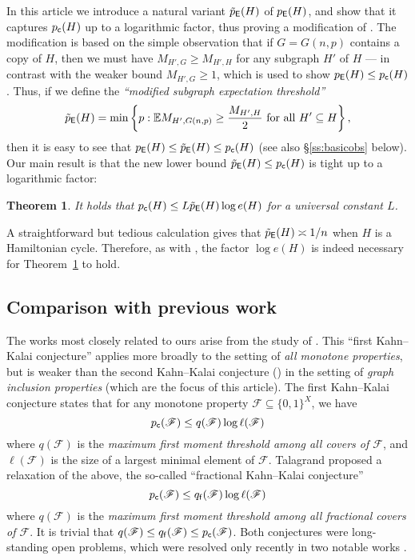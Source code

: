 \documentclass[11pt,reqno]{amsart}
\theoremstyle{plain}
\newtheorem{theorem}{Theorem}
\theoremstyle{definition}
\theoremstyle{remark}
\newcommand{\E}{\mathbb{E}}
\newcommand{\beq}{\begin{equation}}
\newcommand{\eeq}{\end{equation}}
\begin{document}
In this article we introduce a natural variant $\tilde{p}_\mathsf{E}(H)$ of $p_\mathsf{E}(H)$, and show that it captures $p_\mathsf{c}(H)$ up to a logarithmic factor, thus proving a modification of \cite[Conjecture~2]{kahn2007thresholds}. The modification is based on the simple observation that if $G=G(n,p)$ contains a copy of $H$, then we must have $M_{H',G} \ge M_{H',H}$ for any subgraph $H'$ of $H$ --- in contrast with the weaker bound $M_{H',G}\ge1$, which is used to show $p_\mathsf{E}(H) \le p_\mathsf{c}(H)$. Thus, if we define the  \emph{``modified subgraph expectation threshold''} 
	\beq\label{e:pEnew}
	\pEnew(H)
	=\min\bigg\{ p : \E M_{H',G(n,p)} \ge \frac{M_{H',H}}{2}
	\textup{ for all } H' \subseteq H\bigg\}\,,
	\eeq
then it is easy to see that $p_\mathsf{E}(H) \le \tilde{p}_\mathsf{E}(H) \le p_\mathsf{c}(H)$ {(see also \S\ref{ss:basicobs} below).} Our main result is that the
new lower bound $\tilde{p}_\mathsf{E}(H)\le p_\mathsf{c}(H)$ is tight up to a logarithmic factor:

\begin{theorem}\label{thm:main}
It holds that $p_\mathsf{c}(H) \le L \tilde{p}_\mathsf{E}(H)\log e(H)$ for a universal constant $L$.
\end{theorem} 

A straightforward but tedious calculation gives that $\tilde{p}_\mathsf{E}(H)\asymp 1/n$ when $H$ is a Hamiltonian cycle. Therefore, as with
\cite[Conjecture~2]{kahn2007thresholds}, the factor $\log e(H)$ is indeed necessary for Theorem~\ref{thm:main} to hold.

\subsection{Comparison with previous work}

The works most closely related to ours arise from the study of  \cite[Conjecture~1]{kahn2007thresholds}. 
 This ``first Kahn--Kalai conjecture'' applies more broadly to the setting of \emph{all monotone properties}, but is weaker than the second Kahn--Kalai conjecture (\cite[Conjecture~2]{kahn2007thresholds}) in the setting of \emph{graph inclusion properties} (which are the focus of this article). The first Kahn--Kalai conjecture states that for any monotone property $\mathscr{F}\subseteq\{0,1\}^X$, we have
	\[
	p_\mathsf{c}(\mathscr{F}) \le q(\mathscr{F}) \log \ell(\mathscr{F})
	\]
where $q(\mathscr{F})$ is the \emph{maximum first moment threshold among all covers of $\mathscr{F}$}, and $\ell(\mathscr{F})$ is the size of a largest minimal element of $\mathscr{F}$. Talagrand \cite{MR2743011} proposed a relaxation of the above, the so-called ``fractional Kahn--Kalai conjecture''
	\[
	p_\mathsf{c}(\mathscr{F}) 
	\le q_\mathsf{f}(\mathscr{F}) \log \ell(\mathscr{F})
	\]
where $q(\mathscr{F})$ is the \emph{maximum first moment threshold among all fractional covers of $\mathscr{F}$}. It is trivial that $q(\mathscr{F})\le q_\mathsf{f}(\mathscr{F})\le p_\mathsf{c}(\mathscr{F})$. Both conjectures were long-standing open problems, which were resolved only recently in two notable works \cite{fracKK_annals,park2022proof}.
\end{document}
